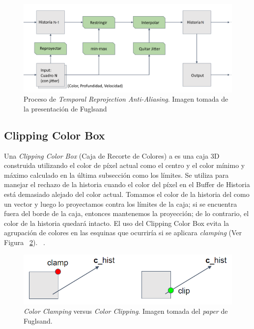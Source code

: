 \documentclass{cslthse-msc}
\begin{document}
\begin{figure}[H]
	\centering
	\includegraphics[scale=0.4]{images/sampling_process.png}
	\caption{Proceso de \textit{Temporal Reprojection Anti-Aliasing}. Imagen tomada de la presentación de Fuglsand \protect\cite{Fuglsand2016}}\label{fig:samplingprocess}
\end{figure}

\subsection{Clipping Color Box} 
Una \textit{Clipping Color Box} (Caja de Recorte de Colores) a es una caja 3D construida utilizando el color de píxel actual como el centro y el color mínimo y máximo calculado en la última subsección como los límites. Se utiliza para manejar el rechazo de la historia cuando el color del píxel en el Buffer de Historia está demasiado alejado del color actual. Tomamos el color de la historia del como un vector y luego lo proyectamos contra los límites de la caja; si se encuentra fuera del borde de la caja, entonces mantenemos la proyección; de lo contrario, el color de la historia quedará intacto. El uso del Clipping Color Box evita la agrupación de colores en las esquinas que ocurriría si se aplicara \textit{clamping} (Ver Figura ~\ref{fig:clippingbox}). ~\cite{Fuglsand2016}.

\begin{figure}[!hbt]
	\centering
	\includegraphics[scale=0.4]{images/clipping_box.png}
	\caption{\textit{Color Clamping} versus \textit{Color Clipping}. Imagen tomada del \textit{paper} de Fuglsand. \protect\cite{Fuglsand2016}}\label{fig:clippingbox}
\end{figure}
\end{document}
